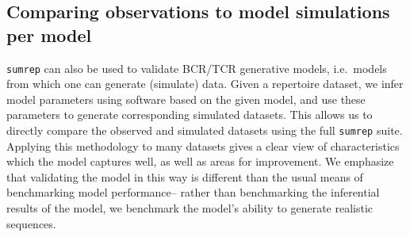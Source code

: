 \documentclass{article}
\begin{document}
\subsection*{Comparing observations to model simulations per model}
\texttt{sumrep} can also be used to validate BCR/TCR generative models, i.e.\ models from which one can generate (simulate) data.
Given a repertoire dataset, we infer model parameters using software based on the given model, and use these parameters to generate corresponding simulated datasets.
This allows us to directly compare the observed and simulated datasets using the full \texttt{sumrep} suite.
Applying this methodology to many datasets gives a clear view of characteristics which the model captures well, as well as areas for improvement.
We emphasize that validating the model in this way is different than the usual means of benchmarking model performance-- rather than benchmarking the inferential results of the model, we benchmark the model's ability to generate realistic sequences.
\end{document}
